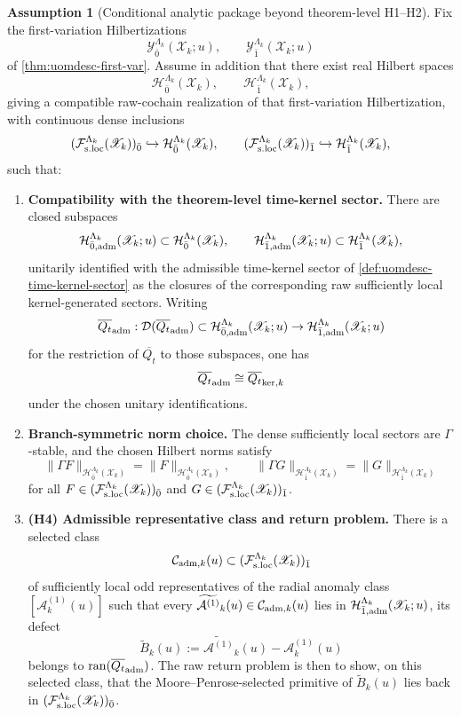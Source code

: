 \documentclass[11pt]{article}
\theoremstyle{definition}
\newtheorem{assumption}[definition]{Assumption}
\theoremstyle{plain}
\theoremstyle{remark}
\newcommand{\Fsloc}{\mathcal F_{\rm s.loc}}
\newcommand{\Xscr}{\mathscr X}
\newcommand{\Aone}{\mathcal A^{(1)}}
\newcommand{\Qt}{Q_t}
\newcommand{\into}{\hookrightarrow}
\begin{document}
\begin{assumption}[Conditional analytic package beyond theorem-level H1--H2]
\label{ass:uomdesc-hodge}
Fix the first-variation Hilbertizations
\[
\mathcal Y_{\bar 0}^{\Lambda_k}(\Xscr_k;u),
\qquad
\mathcal Y_{\bar 1}^{\Lambda_k}(\Xscr_k;u)
\]
of \cref{thm:uomdesc-first-var}.
Assume in addition that there exist real Hilbert spaces
\[
\mathcal H_{\bar 0}^{\Lambda_k}(\Xscr_k),
\qquad
\mathcal H_{\bar 1}^{\Lambda_k}(\Xscr_k),
\]
giving a compatible raw-cochain realization of that first-variation Hilbertization, with
continuous dense inclusions
\[
(\Fsloc^{\Lambda_k}(\Xscr_k))_{\bar 0}\into \mathcal H_{\bar 0}^{\Lambda_k}(\Xscr_k),
\qquad
(\Fsloc^{\Lambda_k}(\Xscr_k))_{\bar 1}\into \mathcal H_{\bar 1}^{\Lambda_k}(\Xscr_k),
\]
such that:
\begin{enumerate}[leftmargin=2em]
\item \textbf{Compatibility with the theorem-level time-kernel sector.}
  There are closed subspaces
  \[
  \mathcal H_{\bar 0,{\rm adm}}^{\Lambda_k}(\Xscr_k;u)\subset\mathcal H_{\bar 0}^{\Lambda_k}(\Xscr_k),
  \qquad
  \mathcal H_{\bar 1,{\rm adm}}^{\Lambda_k}(\Xscr_k;u)\subset\mathcal H_{\bar 1}^{\Lambda_k}(\Xscr_k),
  \]
  unitarily identified with the admissible time-kernel sector of
  \cref{def:uomdesc-time-kernel-sector} as the closures of the corresponding raw sufficiently local
  kernel-generated sectors.
  Writing
  \[
  \overline{\Qt}_{\rm adm}:
  \mathcal D(\overline{\Qt}_{\rm adm})\subset
  \mathcal H_{\bar 0,{\rm adm}}^{\Lambda_k}(\Xscr_k;u)
  \to
  \mathcal H_{\bar 1,{\rm adm}}^{\Lambda_k}(\Xscr_k;u)
  \]
  for the restriction of \(\overline{\Qt}\) to those subspaces, one has
  \[
  \overline{\Qt}_{\rm adm}\cong \overline{\Qt}_{{\rm ker},k}
  \]
  under the chosen unitary identifications.
\item \textbf{Branch-symmetric norm choice.}
  The dense sufficiently local sectors are \(\Gamma\)-stable, and the chosen Hilbert norms satisfy
  \[
  \|\Gamma F\|_{\mathcal H_{\bar 0}^{\Lambda_k}(\Xscr_k)}
  =
  \|F\|_{\mathcal H_{\bar 0}^{\Lambda_k}(\Xscr_k)},
  \qquad
  \|\Gamma G\|_{\mathcal H_{\bar 1}^{\Lambda_k}(\Xscr_k)}
  =
  \|G\|_{\mathcal H_{\bar 1}^{\Lambda_k}(\Xscr_k)}
  \]
  for all \(F\in(\Fsloc^{\Lambda_k}(\Xscr_k))_{\bar 0}\) and
  \(G\in(\Fsloc^{\Lambda_k}(\Xscr_k))_{\bar 1}\).
\item \textbf{(H4) Admissible representative class and return problem.}
  There is a selected class
  \[
  \mathcal C_{{\rm adm},k}(u)\subset(\Fsloc^{\Lambda_k}(\Xscr_k))_{\bar 1}
  \]
  of sufficiently local odd representatives of the radial anomaly class
  \(
  [\Aone_k(u)]
  \)
  such that every
  \(
  \widetilde{\Aone}_k(u)\in\mathcal C_{{\rm adm},k}(u)
  \)
  lies in \(\mathcal H_{\bar 1,{\rm adm}}^{\Lambda_k}(\Xscr_k;u)\), its defect
  \[
  \widetilde{B}_k(u):=\widetilde{\Aone}_k(u)-\Aone_k(u)
  \]
  belongs to \(\mathrm{ran}(\overline{\Qt}_{\rm adm})\).
  The raw return problem is then to show, on this selected class, that the Moore--Penrose-selected
  primitive of \(\widetilde{B}_k(u)\) lies back in
  \((\Fsloc^{\Lambda_k}(\Xscr_k))_{\bar 0}\).
\end{enumerate}
\end{assumption}
\end{document}
